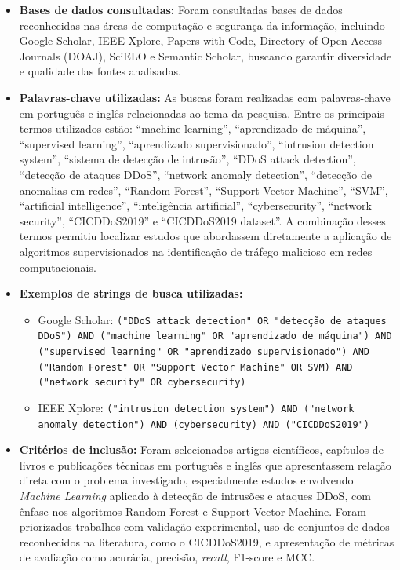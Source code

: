 \documentclass[
    12pt,                %
    openright,           %
    oneside,             %
    a4paper,             %
    english,             %
    brazil               %
]{abntex2}
\begin{document}
\begin{itemize}
    \item \textbf{Bases de dados consultadas:} Foram consultadas bases de dados reconhecidas nas áreas de computação e segurança da informação, incluindo Google Scholar, IEEE Xplore, Papers with Code, Directory of Open Access Journals (DOAJ), SciELO e Semantic Scholar, buscando garantir diversidade e qualidade das fontes analisadas.

    \item \textbf{Palavras-chave utilizadas:} As buscas foram realizadas com palavras-chave em português e inglês relacionadas ao tema da pesquisa. Entre os principais termos utilizados estão: ``machine learning'', ``aprendizado de máquina'', ``supervised learning'', ``aprendizado supervisionado'', ``intrusion detection system'', ``sistema de detecção de intrusão'', ``DDoS attack detection'', ``detecção de ataques DDoS'', ``network anomaly detection'', ``detecção de anomalias em redes'', ``Random Forest'', ``Support Vector Machine'', ``SVM'', ``artificial intelligence'', ``inteligência artificial'', ``cybersecurity'', ``network security'', ``CICDDoS2019'' e ``CICDDoS2019 dataset''. A combinação desses termos permitiu localizar estudos que abordassem diretamente a aplicação de algoritmos supervisionados na identificação de tráfego malicioso em redes computacionais.

    \item \textbf{Exemplos de strings de busca utilizadas:}
    \begin{itemize}
        \item Google Scholar: \texttt{("DDoS attack detection" OR "detecção de ataques DDoS") AND ("machine learning" OR "aprendizado de máquina") AND ("supervised learning" OR "aprendizado supervisionado") AND ("Random Forest" OR "Support Vector Machine" OR SVM) AND ("network security" OR cybersecurity)}
        \item IEEE Xplore: \texttt{("intrusion detection system") AND ("network anomaly detection") AND (cybersecurity) AND ("CICDDoS2019")}
    \end{itemize}

    \item \textbf{Critérios de inclusão:} Foram selecionados artigos científicos, capítulos de livros e publicações técnicas em português e inglês que apresentassem relação direta com o problema investigado, especialmente estudos envolvendo \textit{Machine Learning} aplicado à detecção de intrusões e ataques DDoS, com ênfase nos algoritmos Random Forest e Support Vector Machine. Foram priorizados trabalhos com validação experimental, uso de conjuntos de dados reconhecidos na literatura, como o CICDDoS2019, e apresentação de métricas de avaliação como acurácia, precisão, \textit{recall}, F1-score e MCC.


\end{itemize}
\end{document}
